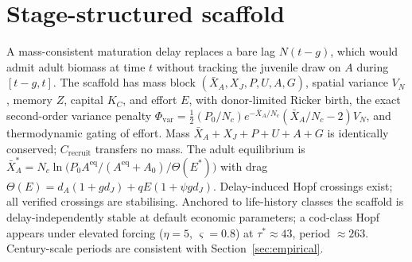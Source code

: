 \documentclass[11pt]{article}
\theoremstyle{definition}
\begin{document}
\section{Stage-structured scaffold}
\label{app:scaffold}

A mass-consistent maturation delay replaces a bare lag $N(t-g)$, which would admit adult biomass at time $t$ without tracking the juvenile draw on $A$ during $[t-g,t]$. The scaffold has mass block $(\bar X_A,X_J,P,U,A,G)$, spatial variance $V_N$, memory $Z$, capital $K_C$, and effort $E$, with donor-limited Ricker birth, the exact second-order variance penalty $\Phi_{\mathrm{var}}=\tfrac12(P_0/N_c)e^{-\bar X_A/N_c}(\bar X_A/N_c-2)V_N$, and thermodynamic gating of effort. Mass $\bar X_A+X_J+P+U+A+G$ is identically conserved; $C_{\mathrm{recruit}}$ transfers no mass. The adult equilibrium is $\bar X_A^*=N_c\ln\bigl(P_0 A^{\mathrm{eq}}/(A^{\mathrm{eq}}+A_0)/\Theta(E^*)\bigr)$ with drag $\Theta(E)=d_A(1+gd_J)+qE(1+\psi g d_J)$. Delay-induced Hopf crossings exist; all verified crossings are stabilising. Anchored to life-history classes the scaffold is delay-independently stable at default economic parameters; a cod-class Hopf appears under elevated forcing ($\eta=5$, $\varsigma=0.8$) at $\tau^*\approx 43$, period $\approx 263$. Century-scale periods are consistent with Section~\ref{sec:empirical}.
\end{document}

